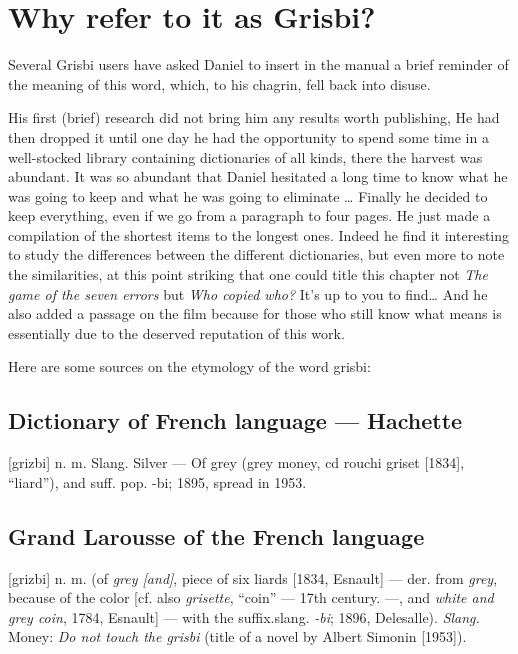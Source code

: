 \newpage 
\section*{Why refer to it as Grisbi?\label{preamble-etymology}}

Several \gls{Grisbi} users have asked Daniel  to insert in the manual a brief reminder of the meaning of this word, which, to his chagrin, fell back into disuse.

His first (brief) research did not bring him any results worth publishing, He had then dropped it until one day he had the opportunity to spend some time in a well-stocked library containing dictionaries of all kinds, there the harvest was abundant. It was so abundant that Daniel  hesitated a long time to know what he was going to keep and what he was going to eliminate \dots{}
Finally he decided to keep everything, even if we go from a paragraph to four pages. He just made a compilation of the shortest items to the longest ones.
Indeed he find it interesting to study the differences between the different dictionaries, but even more to note the similarities, at this point striking that one could title this chapter not \emph{The game of the seven errors} but \emph{Who copied who?} It's up to you to find\dots{}
And he also added a passage on the film because for those who still know what  means is essentially due to the deserved reputation of this work.

Here are some sources on the etymology  of the word grisbi:

\subsection*{Dictionary of French language --- Hachette}

[grizbi] n. m. Slang. Silver --- Of grey (grey money, cd rouchi griset [1834], ``liard''), and suff. pop. -bi; 1895, spread in 1953.

\subsection*{Grand Larousse of the French language}

[grizbi] n. m. (of \emph{grey [and]}, piece of six liards [1834, Esnault] --- der.
from \emph{grey}, because of the color [cf. also \emph{grisette}, ``coin'' --- 17th century. ---, and \emph{white and grey coin}, 1784, Esnault] --- with the suffix.slang. \emph{-bi}; 1896, Delesalle).
\emph{Slang.} Money: \emph{Do not touch the grisbi} (title of a novel by Albert Simonin [1953]).

